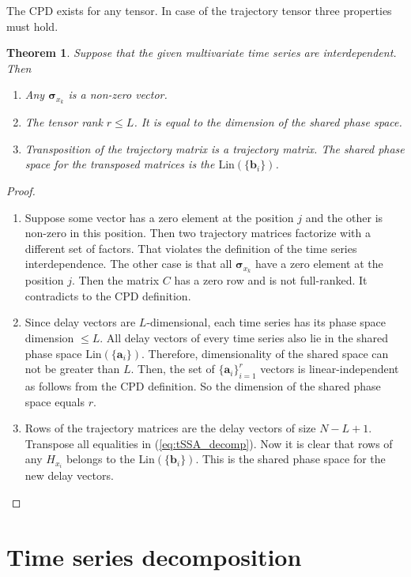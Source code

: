 \documentclass[referee, pdflatex, sn-mathphys-num]{sn-jnl}
\theoremstyle{definition}
\theoremstyle{plain}
\newtheorem{Th}{Theorem}
\begin{document}
	The CPD exists for any tensor. In case of the trajectory tensor three properties must hold.
	
	\begin{Th}\label{th:cpd_phase}
		Suppose that the given multivariate time series are interdependent. Then
		
		\begin{enumerate}
			\item Any $ \boldsymbol{\sigma}_{x_k} $ is a non-zero vector.
			\item The tensor rank $ r \le L $. It is equal to the dimension of the shared phase space.
			\item Transposition of the trajectory matrix is a trajectory matrix. The shared phase space for the transposed matrices is the $ \text{Lin}(\{\mathbf{b}_i\}) $.
		\end{enumerate}
	\end{Th}
	
	\begin{proof}
		\begin{enumerate}
			\item Suppose some vector has a zero element at the position $ j $ and the other is non-zero in this position. Then two trajectory matrices factorize with a different set of factors. That violates the definition of the time series interdependence. The other case is that all $ \boldsymbol{\sigma}_{x_k} $ have a zero element at the position $ j $. Then the matrix $ C $ has a zero row and is not full-ranked. It contradicts to the CPD definition.
			\item Since delay vectors are $ L $-dimensional, each time series has its phase space dimension $ \le L $. All delay vectors of every time series also lie in the shared phase space $ \text{Lin}(\{\mathbf{a}_i\}) $. Therefore, dimensionality of the shared space can not be greater than $ L $. Then, the set of $ \{\mathbf{a}_i\}_{i=1}^r $ vectors is linear-independent as follows from the CPD definition. So the dimension of the shared phase space equals $ r $.
			\item Rows of the trajectory matrices are the delay vectors of size $ N - L + 1 $. Transpose all equalities in (\ref{eq:tSSA_decomp}). Now it is clear that rows of any $ H_{x_i} $ belongs to the $ \text{Lin}(\{\mathbf{b}_i\}) $. This is the shared phase space for the new delay vectors.
		\end{enumerate}
	\end{proof}

	\section{Time series decomposition}\label{sec:decomposition}
	
\end{document}
